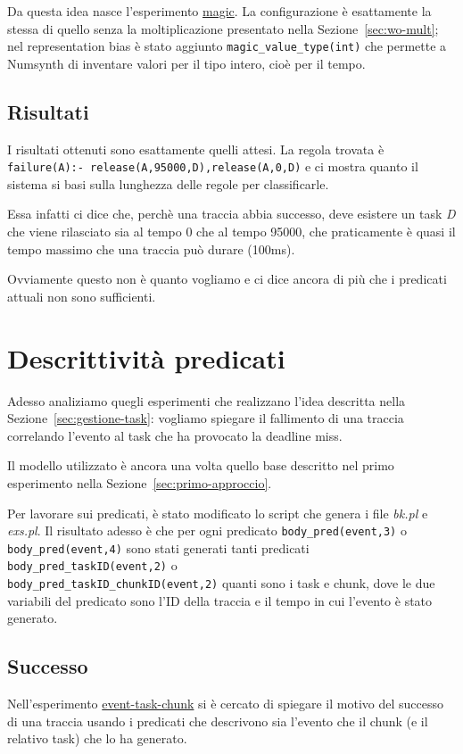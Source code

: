 Da questa idea nasce l'esperimento \href{https://github.com/edoardosarri24/numsynth/tree/main/my-experiments/5-magic/}{magic}. La configurazione è esattamente la stessa di quello senza la moltiplicazione presentato nella Sezione~\ref{sec:wo-mult}; nel representation bias è stato aggiunto \texttt{magic\_value\_type(int)} che permette a Numsynth di inventare valori per il tipo intero, cioè per il tempo.

\subsection{Risultati}
I risultati ottenuti sono esattamente quelli attesi. La regola trovata è \texttt{failure(A):- release(A,95000,D),release(A,0,D)} e ci mostra quanto il sistema si basi sulla lunghezza delle regole per classificarle.

Essa infatti ci dice che, perchè una traccia abbia successo, deve esistere un task \textit{D} che viene rilasciato sia al tempo 0 che al tempo 95000, che praticamente è quasi il tempo massimo che una traccia può durare (100ms).

Ovviamente questo non è quanto vogliamo e ci dice ancora di più che i predicati attuali non sono sufficienti.

\section{Descrittività predicati}
\label{sec:event_task_chunk}
Adesso analiziamo quegli esperimenti che realizzano l'idea descritta nella Sezione~\ref{sec:gestione-task}: vogliamo spiegare il fallimento di una traccia correlando l'evento al task che ha provocato la deadline miss.

Il modello utilizzato è ancora una volta quello base descritto nel primo esperimento nella Sezione~\ref{sec:primo-approccio}.

\myskip

Per lavorare sui predicati, è stato modificato lo script che genera i file \textit{bk.pl} e \textit{exs.pl}. Il risultato adesso è che per ogni predicato \texttt{body\_pred(event,3)} o \texttt{body\_pred(event,4)} sono stati generati tanti predicati \texttt{body\_pred\_taskID(event,2)} o \\ \texttt{body\_pred\_taskID\_chunkID(event,2)} quanti sono i task e chunk, dove le due variabili del predicato sono l'ID della traccia e il tempo in cui l'evento è stato generato.

\subsection{Successo}
Nell'esperimento \href{https://github.com/edoardosarri24/prediction-in-data-driven-system/6-event-task-chunk/}{event-task-chunk} si è cercato di spiegare il motivo del successo di una traccia usando i predicati che descrivono sia l'evento che il chunk (e il relativo task) che lo ha generato.

